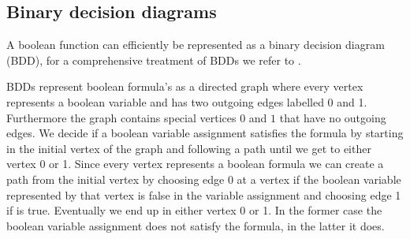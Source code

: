 \subsection{Binary decision diagrams}
\label{sec_prelim_bdd}
A boolean function can efficiently be represented as a binary decision diagram (BDD), for a comprehensive treatment of BDDs we refer to \cite{BDD_book,Handbook_BDD_Chapter}.

BDDs represent boolean formula's as a directed graph where every vertex represents a boolean variable and has two outgoing edges labelled 0 and 1. Furthermore the graph contains special vertices $0$ and $1$ that have no outgoing edges. We decide if a boolean variable assignment satisfies the formula by starting in the initial vertex of the graph and following a path until we get to either vertex 0 or 1. Since every vertex represents a boolean formula we can create a path from the initial vertex by choosing edge 0 at a vertex if the boolean variable represented by that vertex is false in the variable assignment and choosing edge 1 if is true. Eventually we end up in either vertex 0 or 1. In the former case the boolean variable assignment does not satisfy the formula, in the latter it does.

